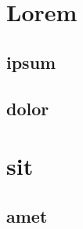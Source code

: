 \documentclass{book}
\begin{document}
\dominitoc
\tableofcontents
\chapter{Lorem}
\minitoc
\section{ipsum}
\section{dolor}
\chapter{sit}
\minitoc
\section{amet}
\end{document}
